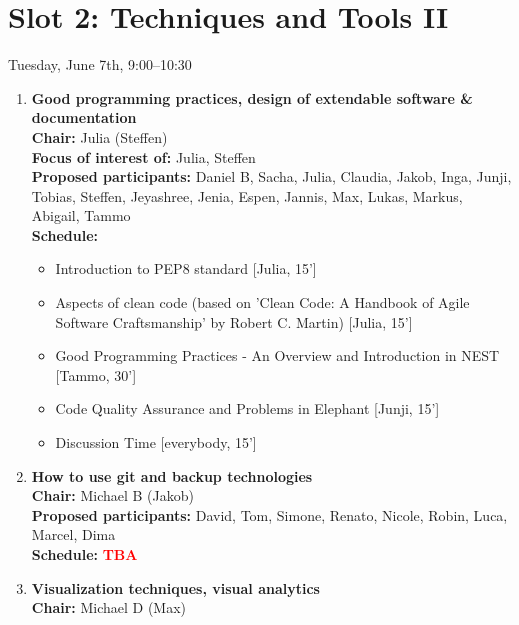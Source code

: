 \documentclass[10pt, a4paper,twoside,american]{article}
\newcommand{\alert}[1]{\textcolor{red}{\bf #1}}
\begin{document}
\section*{Slot 2: Techniques and Tools II}
Tuesday, June 7th, 9:00--10:30

\begin{enumerate}[resume]
\item {\large\bf Good programming practices, design of extendable software \& documentation}\\[1ex]
  {\bf Chair:} Julia (Steffen)\\[1ex]
  {\bf Focus of interest of:} Julia, Steffen\\[1ex]
  {\bf Proposed participants:} Daniel B, Sacha, Julia, Claudia, Jakob, Inga, Junji, Tobias, Steffen, Jeyashree, Jenia, Espen, Jannis, Max, Lukas, Markus, Abigail, Tammo\\[1ex]
  {\bf Schedule:}
  \begin{itemize}
  \item Introduction to PEP8 standard [Julia, 15']
  \item Aspects of clean code (based on 'Clean Code: A Handbook of Agile Software Craftsmanship' by Robert C. Martin) [Julia, 15']
  \item Good Programming Practices - An Overview and Introduction in NEST [Tammo, 30']
  \item Code Quality Assurance and Problems in Elephant [Junji, 15']
  \item Discussion Time [everybody, 15']
  \end{itemize}
\item {\large\bf How to use git and backup technologies}\\[1ex]
  {\bf Chair:} Michael B (Jakob)\\[1ex]
  {\bf Proposed participants:} David, Tom, Simone, Renato, Nicole, Robin, Luca, Marcel, Dima\\[1ex]
  {\bf Schedule:} \alert{TBA}
\item {\large\bf Visualization techniques, visual analytics}\\[1ex]
  {\bf Chair:} Michael D (Max)\\[1ex]

\end{enumerate}
\end{document}
